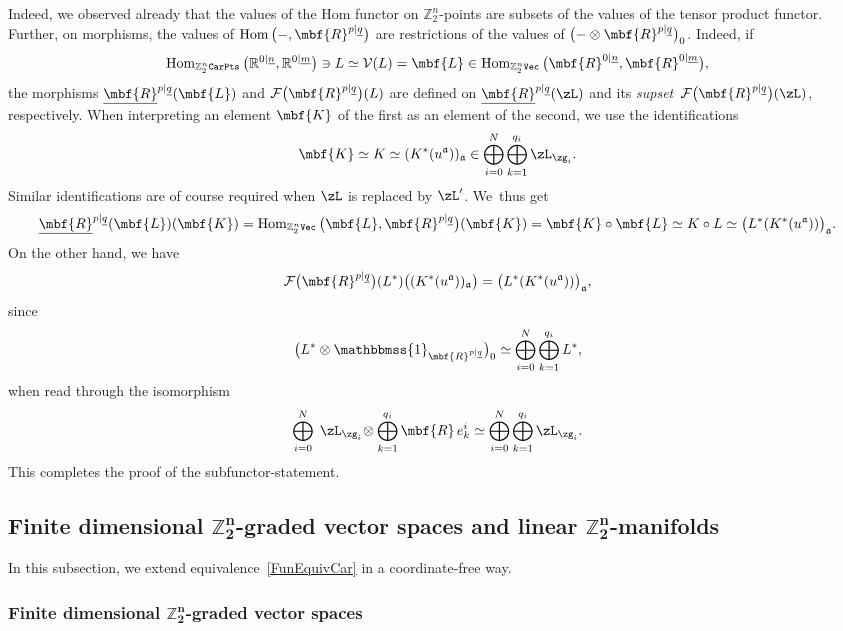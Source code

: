 \documentclass[pdftex]{sigma}%
\newcommand{\Id}{\mathbbmss{1}}
\newcommand{\op}[1]{\operatorname{#1}}
\newcommand{\R}{{\mathbb R}}
\newcommand{\Z}{{\mathbb Z}}
\def\ul{\underline}
\def\cF{\mathcal{F}}
\def\ul{\underline}
\newcommand{\0}{\otimes}
\newcommand{\z}{\Z_2^n}
\numberwithin{equation}{section}
\begin{document}
Indeed, we observed already that the values of the Hom functor on $\Z_2^n$-points are subsets of the values of the tensor product functor. Further, on morphisms, the values of $\op{Hom}\big({-},\mbf{R}^{p|\ul q}\big)$ are restrictions of the values of $\big({-}\0\mbf{R}^{p|\ul q}\big)_0$. Indeed, if
\[
\op{Hom}_{\z\tt CarPts}\big(\R^{0|\ul n},\R^{0|\ul m}\big)\ni L\simeq \mathcal{V}(L)=\mbf{L}\in\op{Hom}_{\z\tt Vec}\big(\mbf{R}^{0|\ul n},\mbf{R}^{0|\ul m}\big),
\]
the morphisms $\ul{\mbf{R}}^{p|\ul q}(\mbf{L})$ and $\cF\big(\mbf{R}^{p|\ul q}\big)(L)$ are defined on $\ul{\mbf{R}}^{p|\ul q}(\zL)$ and its {\it supset} $\,\cF\big(\mbf{R}^{p|\ul q}\big)(\zL)$, respectively. When interpreting an element $\mbf{K}$ of the first as an element of the second, we use the identifications
\[
\mbf{K}\simeq K\simeq (K^*(u^{\mathfrak a}))_{\mathfrak a}\in\bigoplus_{i=0}^N\bigoplus_{k=1}^{q_i}\zL_{\zg_i}.
\]
Similar identifications are of course required when $\zL$ is replaced by $\zL'$. We~thus get
\[
\ul{\mbf{R}}^{p|\ul q}(\mbf{L})(\mbf{K})=\op{Hom}_{\z\tt Vec}\big(\mbf{L},\mbf{R}^{p|\ul q}\big)(\mbf{K})=\mbf{K}\circ\mbf{L}\simeq K\circ L\simeq \big(L^*(K^*(u^{\mathfrak a}))\big)_{\mathfrak a}.
\]
On the other hand, we have
\[
\cF\big(\mbf{R}^{p|\ul q}\big)(L^*)\big((K^*(u^{\mathfrak{a}}))_{\mathfrak{a}}\big) =\big(L^*(K^*(u^{\mathfrak{a}}))\big)_{\mathfrak{a}},
\]
since
\[
\big(L^*\0\Id_{\mbf{R}^{p|\ul q}}\big)_0\simeq \bigoplus_{i=0}^N\bigoplus_{k=1}^{q_i}L^*,
\]
when read through the isomorphism
\[
\bigoplus_{i=0}^N\;\zL_{\zg_i}\!\0\bigoplus_{k=1}^{q_i}\mbf{R}\,e^i_k\simeq \bigoplus_{i=0}^N\bigoplus_{k=1}^{q_i}\zL_{\zg_i}.
\]
This completes the proof of the subfunctor-statement.

\subsection[Finite dimensional Z2n-graded vector spaces and linear Z2n-manifolds]
{Finite dimensional $\boldsymbol{\Z_2^n}$-graded vector spaces and linear $\boldsymbol{\Z_2^n}$-manifolds}

In this subsection, we extend equivalence~\eqref{FunEquivCar} in a coordinate-free way.

\newcommand{\bbN}{\mathbb{N}}

\subsubsection[Finite dimensional Z2n-graded vector spaces]
{Finite dimensional $\boldsymbol{\Z_2^n}$-graded vector spaces}
\end{document}

